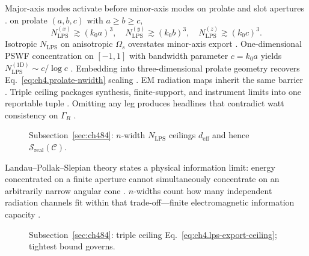Major-axis modes activate before minor-axis modes on prolate and slot apertures \cite{hansen1988}.
on prolate \((a,b,c)\) with \(a\ge b\ge c\),
\begin{equation}
\label{eq:ch4.lps-directional-record}
N_{\mathrm{LPS}}^{(x)}\gtrsim(k_{0}a)^{3},\quad
N_{\mathrm{LPS}}^{(y)}\gtrsim(k_{0}b)^{3},\quad
N_{\mathrm{LPS}}^{(z)}\gtrsim(k_{0}c)^{3}.
\end{equation}
Isotropic \(N_{\mathrm{LPS}}\) on anisotropic \(\Omega_{s}\) overstates minor-axis export \cite{harrington2001}.
One-dimensional PSWF concentration on \([-1,1]\) with bandwidth parameter \(c=k_{0}a\) yields \(N_{\mathrm{LPS}}^{(1\mathrm{D})}\sim c/\log c\)
\cite{hansen1988}. Embedding into three-dimensional prolate geometry recovers Eq.~\eqref{eq:ch4.prolate-nwidth} scaling
\cite{stratton1941}. EM radiation maps inherit the same barrier \cite{hansen1988}.
Triple ceiling packages synthesis, finite-support, and instrument limits into one reportable tuple \cite{stratton1941}. Omitting any leg produces headlines that contradict watt consistency on $\Gamma_R$ \cite{hansen1988}.
\begin{figure}[t]
\centering
{}
\caption{Subsection~\ref{sec:ch484}: \(n\)-width \(N_{\mathrm{LPS}}\) ceilings \(d_{\mathrm{eff}}\) and hence \(\mathcal{S}_{\mathrm{real}}(\mathcal{C})\).}
\label{fig:ch4.lps-nwidth}
\end{figure}
Landau--Pollak--Slepian theory states a physical information limit: energy concentrated on a finite aperture cannot simultaneously concentrate on an arbitrarily narrow angular cone \cite{landau1962}. $n$-widths count how many independent radiation channels fit within that trade-off---finite electromagnetic information capacity \cite{stratton1941}.
\begin{figure}[t]
\centering
{}
\caption{Subsection~\ref{sec:ch484}: triple ceiling Eq.~\eqref{eq:ch4.lps-export-ceiling}; tightest bound governs.}
\label{fig:ch4.triple-ceiling}
\end{figure}
